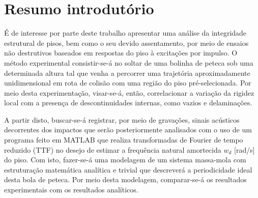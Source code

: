 \documentclass[10pt,twocolumn]{article}
\begin{document}
	
	
	\section{Resumo introdutório}
	
	É de interesse por parte deste trabalho apresentar uma análise da integridade estrutural de pisos, bem como o seu devido assentamento, por meio de ensaios não destrutivos baseados em respostas do piso à excitações por impulso. O método experimental consistir-se-á no soltar de uma bolinha de peteca sob uma determinada altura tal que venha a percorrer uma trajetória aproximadamente unidimensional em rota de colisão com uma região do piso pré-selecionada. Por meio desta experimentação, visar-se-á, então, correlacionar a variação da rigidez local com a presença de descontinuidades internas, como vazios e delaminações. 
	
	A partir disto, buscar-se-á registrar, por meio de gravações, sinais acústicos decorrentes dos impactos que serão posteriormente analisados com o uso de um programa feito em MATLAB que realiza transformadas de Fourier de tempo reduzido (TTF) no desejo de estimar a frequência natural amortecida $w_{d}$ [rad/s] do piso. Com isto, fazer-se-á uma modelagem de um sistema massa-mola com estruturação matemática analítica e trivial que descreverá a periodicidade ideal desta bola de peteca. Por meio desta modelagem, comparar-se-á os resultados experimentais com os resultados analíticos.
	
\end{document}
